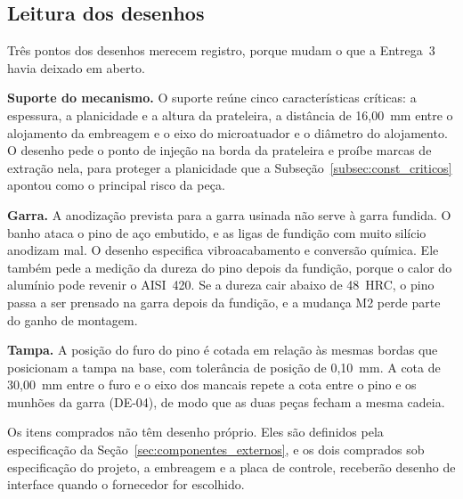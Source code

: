 \subsection{Leitura dos desenhos}
\label{subsec:des_leitura}

Três pontos dos desenhos merecem registro, porque mudam o que a Entrega~3 havia deixado em aberto.

\textbf{Suporte do mecanismo.} O suporte reúne cinco características críticas: a espessura, a planicidade e a altura da prateleira, a distância de 16,00~mm entre o alojamento da embreagem e o eixo do microatuador e o diâmetro do alojamento. O desenho pede o ponto de injeção na borda da prateleira e proíbe marcas de extração nela, para proteger a planicidade que a Subseção~\ref{subsec:const_criticos} apontou como o principal risco da peça.

\textbf{Garra.} A anodização prevista para a garra usinada não serve à garra fundida. O banho ataca o pino de aço embutido, e as ligas de fundição com muito silício anodizam mal. O desenho especifica vibroacabamento e conversão química. Ele também pede a medição da dureza do pino depois da fundição, porque o calor do alumínio pode revenir o AISI~420. Se a dureza cair abaixo de 48~HRC, o pino passa a ser prensado na garra depois da fundição, e a mudança M2 perde parte do ganho de montagem.

\textbf{Tampa.} A posição do furo do pino é cotada em relação às mesmas bordas que posicionam a tampa na base, com tolerância de posição de 0,10~mm. A cota de 30,00~mm entre o furo e o eixo dos mancais repete a cota entre o pino e os munhões da garra (DE-04), de modo que as duas peças fecham a mesma cadeia.

Os itens comprados não têm desenho próprio. Eles são definidos pela especificação da Seção~\ref{sec:componentes_externos}, e os dois comprados sob especificação do projeto, a embreagem e a placa de controle, receberão desenho de interface quando o fornecedor for escolhido.
